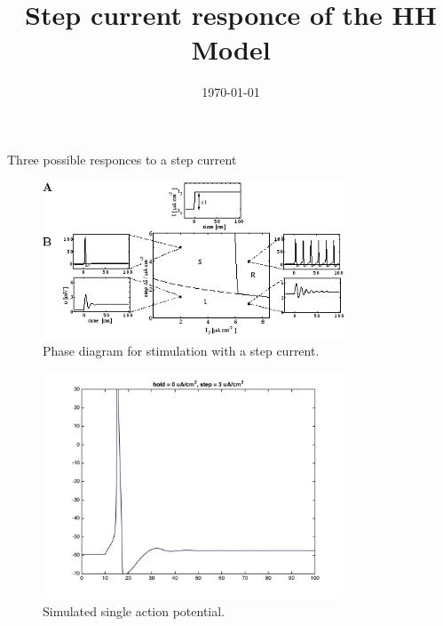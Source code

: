 \documentclass{beamer}
\title[A constant current applied to the HH model produces a train of action potentials.]{Step current responce of the HH Model}
\author[E.Ioannidis \& J.Hobin] {\
   \texorpdfstring{\
        \begin{columns}
            \column{.45\linewidth}
            \centering
            Eleftherios Ioannidis\\
            \href{mailto:elefthei@mit.edu}{elefthei@mit.edu}
            \column{.45\linewidth}
            \centering
            James Hobin\\
            \href{mailto:hobinjk@mit.edu}{hobinjk@mit.edu}
        \end{columns}
   }
   {Eleftherios Ioannidis \& James Hobin}
}
\institute{MIT EECS}
\date{\today}
\begin{document}
\begin{frame}
  \titlepage{}
\end{frame}

\begin{frame}{Three possible responces to a step current}
  \begin{figure}
    \centering
    \includegraphics[width = 0.8\textwidth]{./pictures/gerstner.png}
    \caption{Phase diagram for stimulation with a step current.}
  \end{figure}
\end{frame}

\begin{frame}
  \begin{figure}
    \centering
    \includegraphics[width = 0.8\textwidth]{./images/current_0_3.jpg}
    \caption{Simulated single action potential.}
  \end{figure}
\end{frame}
\end{document}
